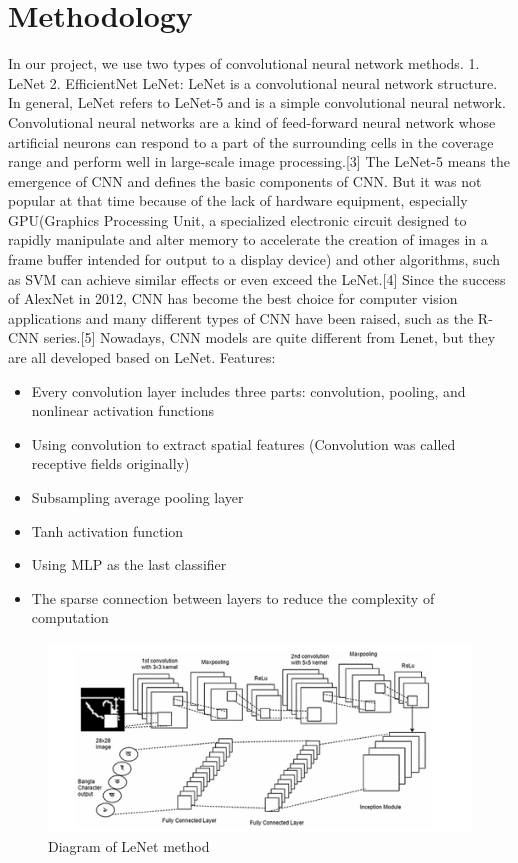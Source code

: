 \documentclass{article}
\begin{document}
\section{Methodology}

In our project, we use two types of convolutional neural network methods.
1.	LeNet
2.	EfficientNet
LeNet: LeNet is a convolutional neural network structure. In general, LeNet refers to LeNet-5 and is a simple convolutional neural network. Convolutional neural networks are a kind of feed-forward neural network whose artificial neurons can respond to a part of the surrounding cells in the coverage range and perform well in large-scale image processing.[3] 
The LeNet-5 means the emergence of CNN and defines the basic components of CNN. But it was not popular at that time because of the lack of hardware equipment, especially GPU(Graphics Processing Unit, a specialized electronic circuit designed to rapidly manipulate and alter memory to accelerate the creation of images in a frame buffer intended for output to a display device) and other algorithms, such as SVM can achieve similar effects or even exceed the LeNet.[4] 
Since the success of AlexNet in 2012, CNN has become the best choice for computer vision applications and many different types of CNN have been raised, such as the R-CNN series.[5] Nowadays, CNN models are quite different from Lenet, but they are all developed based on LeNet.
Features:
\begin{itemize}
\item 	Every convolution layer includes three parts: convolution, pooling, and nonlinear activation functions
\item 	Using convolution to extract spatial features (Convolution was called receptive fields originally)
\item 	Subsampling average pooling layer
\item     Tanh activation function
\item 	Using MLP as the last classifier
\item 	The sparse connection between layers to reduce the complexity of computation
\end{itemize}


\begin{figure}
\centering
 \includegraphics{fig.PNG}
\caption{ Diagram of LeNet method }
\end{figure}
   
\end{document}
